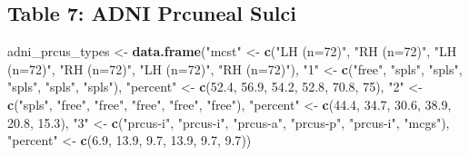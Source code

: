 \documentclass[
]{article}
\newenvironment{Shaded}{\begin{snugshade}}{\end{snugshade}}
\newcommand{\DecValTok}[1]{\textcolor[rgb]{0.00,0.00,0.81}{#1}}
\newcommand{\FloatTok}[1]{\textcolor[rgb]{0.00,0.00,0.81}{#1}}
\newcommand{\KeywordTok}[1]{\textcolor[rgb]{0.13,0.29,0.53}{\textbf{#1}}}
\newcommand{\NormalTok}[1]{#1}
\newcommand{\StringTok}[1]{\textcolor[rgb]{0.31,0.60,0.02}{#1}}
\begin{document}
\hypertarget{table-7-adni-prcuneal-sulci}{%
\subsection{Table 7: ADNI Prcuneal
Sulci}\label{table-7-adni-prcuneal-sulci}}

\begin{Shaded}
\begin{Highlighting}[]
\NormalTok{adni_prcus_types <-}\StringTok{ }\KeywordTok{data.frame}\NormalTok{(}\StringTok{"mcst"}\NormalTok{ <-}\StringTok{ }\KeywordTok{c}\NormalTok{(}\StringTok{"LH (n=72)"}\NormalTok{, }\StringTok{"RH (n=72)"}\NormalTok{, }\StringTok{"LH (n=72)"}\NormalTok{, }\StringTok{"RH (n=72)"}\NormalTok{, }\StringTok{"LH (n=72)"}\NormalTok{, }\StringTok{"RH (n=72)"}\NormalTok{),}
                               \StringTok{"1"}\NormalTok{ <-}\StringTok{ }\KeywordTok{c}\NormalTok{(}\StringTok{"free"}\NormalTok{, }\StringTok{"spls"}\NormalTok{,    }\StringTok{"spls"}\NormalTok{, }\StringTok{"spls"}\NormalTok{,    }\StringTok{"spls"}\NormalTok{, }\StringTok{"spls"}\NormalTok{),}
                               \StringTok{"percent"}\NormalTok{ <-}\StringTok{ }\KeywordTok{c}\NormalTok{(}\FloatTok{52.4}\NormalTok{, }\FloatTok{56.9}\NormalTok{,   }\FloatTok{54.2}\NormalTok{, }\FloatTok{52.8}\NormalTok{,        }\FloatTok{70.8}\NormalTok{, }\DecValTok{75}\NormalTok{),}
                               \StringTok{"2"}\NormalTok{ <-}\StringTok{ }\KeywordTok{c}\NormalTok{(}\StringTok{"spls"}\NormalTok{, }\StringTok{"free"}\NormalTok{,    }\StringTok{"free"}\NormalTok{, }\StringTok{"free"}\NormalTok{,    }\StringTok{"free"}\NormalTok{, }\StringTok{"free"}\NormalTok{),}
                               \StringTok{"percent"}\NormalTok{ <-}\StringTok{ }\KeywordTok{c}\NormalTok{(}\FloatTok{44.4}\NormalTok{, }\FloatTok{34.7}\NormalTok{,   }\FloatTok{30.6}\NormalTok{, }\FloatTok{38.9}\NormalTok{,           }\FloatTok{20.8}\NormalTok{, }\FloatTok{15.3}\NormalTok{),}
                               \StringTok{"3"}\NormalTok{ <-}\StringTok{ }\KeywordTok{c}\NormalTok{(}\StringTok{"prcus-i"}\NormalTok{, }\StringTok{"prcus-i"}\NormalTok{, }\StringTok{"prcus-a"}\NormalTok{, }\StringTok{"prcus-p"}\NormalTok{,    }\StringTok{"prcus-i"}\NormalTok{, }\StringTok{"mcgs"}\NormalTok{),}
                               \StringTok{"percent"}\NormalTok{ <-}\StringTok{ }\KeywordTok{c}\NormalTok{(}\FloatTok{6.9}\NormalTok{, }\FloatTok{13.9}\NormalTok{,        }\FloatTok{9.7}\NormalTok{, }\FloatTok{13.9}\NormalTok{,           }\FloatTok{9.7}\NormalTok{, }\FloatTok{9.7}\NormalTok{))}


\end{Highlighting}
\end{Shaded}
\end{document}
